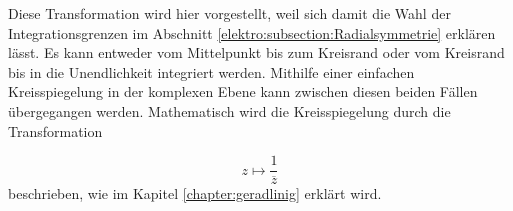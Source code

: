Diese Transformation wird hier vorgestellt, weil sich damit die Wahl der Integrationsgrenzen im Abschnitt \ref{elektro:subsection:Radialsymmetrie} erklären lässt. 
Es kann entweder vom Mittelpunkt bis zum Kreisrand oder vom Kreisrand bis in die Unendlichkeit integriert werden. 
Mithilfe einer einfachen Kreisspiegelung in der komplexen Ebene kann zwischen diesen beiden Fällen übergegangen werden.
Mathematisch wird die Kreisspiegelung durch die Transformation

\begin{equation*}
    z \mapsto \frac{1}{\overline{z}}
\end{equation*}
beschrieben, wie im Kapitel \ref{chapter:geradlinig} erklärt wird. 




